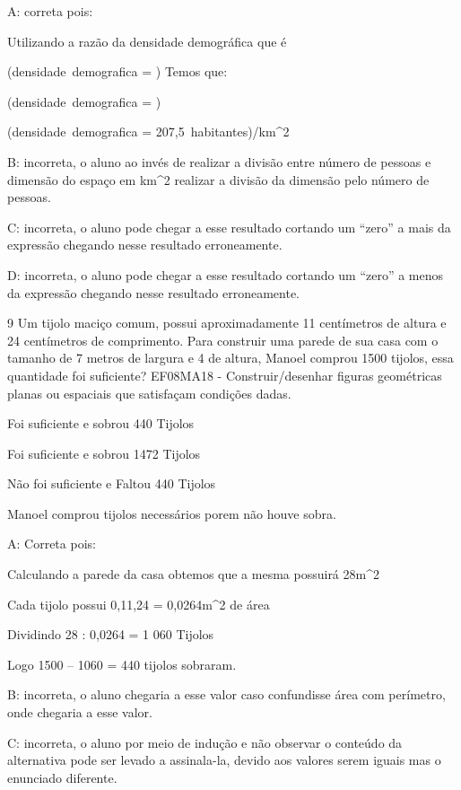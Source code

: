 A: correta pois:

Utilizando a razão da densidade demográfica que é

(densidade\ demografica = )
Temos que:

(densidade\ demografica = )

(densidade\ demografica = 207,5\ habitantes)/km^2

B: incorreta, o aluno ao invés de realizar a divisão entre número de
pessoas e dimensão do espaço em km^2 realizar a divisão da dimensão pelo
número de pessoas.

C: incorreta, o aluno pode chegar a esse resultado cortando um ``zero''
a mais da expressão chegando nesse resultado erroneamente.

D: incorreta, o aluno pode chegar a esse resultado cortando um ``zero''
a menos da expressão chegando nesse resultado erroneamente.

\num{9} Um tijolo maciço comum, possui aproximadamente 11 centímetros de
altura e 24 centímetros de comprimento. Para construir uma parede de sua
casa com o tamanho de 7 metros de largura e 4 de altura, Manoel comprou
1500 tijolos, essa quantidade foi suficiente? EF08MA18 -
Construir/desenhar figuras geométricas planas ou espaciais que
satisfaçam condições dadas.

\item Foi suficiente e sobrou 440 Tijolos
\item Foi suficiente e sobrou 1472 Tijolos
\item Não foi suficiente e Faltou 440 Tijolos
\item Manoel comprou tijolos necessários porem não houve sobra.

A: Correta pois:

Calculando a parede da casa obtemos que a mesma possuirá 28m^2

Cada tijolo possui 0,11,24 = 0,0264m^2 de área

Dividindo 28 : 0,0264 = 1 060 Tijolos

Logo 1500 -- 1060 = 440 tijolos sobraram.

B: incorreta, o aluno chegaria a esse valor caso confundisse área com
perímetro, onde chegaria a esse valor.

C: incorreta, o aluno por meio de indução e não observar o conteúdo da
alternativa pode ser levado a assinala-la, devido aos valores serem
iguais mas o enunciado diferente.

